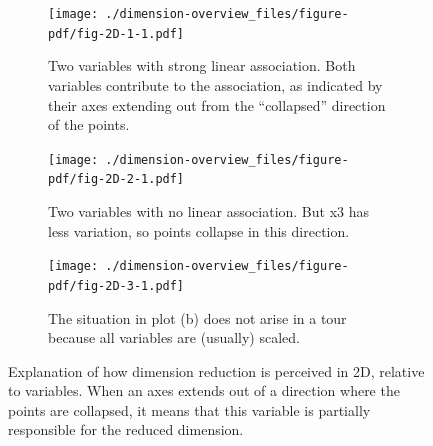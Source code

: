 \documentclass[
  letterpaper,
]{book}
\begin{document}
\begin{figure}

\begin{minipage}[t]{0.33\linewidth}

{\centering 

\begin{figure}

{\centering \texttt{[image: ./dimension-overview\_files/figure-pdf/fig-2D-1-1.pdf]}

}

\caption{Two variables with strong linear association. Both variables
contribute to the association, as indicated by their axes extending out
from the ``collapsed'' direction of the points.}

\end{figure}

}

\end{minipage}%
%
\begin{minipage}[t]{0.33\linewidth}

{\centering 

\begin{figure}

{\centering \texttt{[image: ./dimension-overview\_files/figure-pdf/fig-2D-2-1.pdf]}

}

\caption{Two variables with no linear association. But x3 has less
variation, so points collapse in this direction.}

\end{figure}

}

\end{minipage}%
%
\begin{minipage}[t]{0.33\linewidth}

{\centering 

\begin{figure}

{\centering \texttt{[image: ./dimension-overview\_files/figure-pdf/fig-2D-3-1.pdf]}

}

\caption{The situation in plot (b) does not arise in a tour because all
variables are (usually) scaled.}

\end{figure}

}

\end{minipage}%

\caption{\label{fig-2D}Explanation of how dimension reduction is
perceived in 2D, relative to variables. When an axes extends out of a
direction where the points are collapsed, it means that this variable is
partially responsible for the reduced dimension.}

\end{figure}
\end{document}
